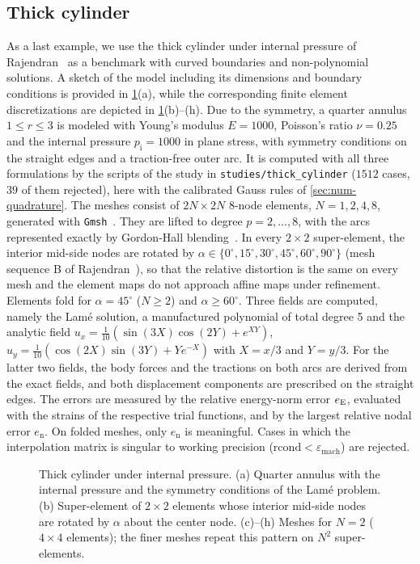 \subsection{Thick cylinder}
\label{sec:num-cylinder}
%
As a last example, we use the thick cylinder under internal pressure of Rajendran~\cite[Sect.~5.9]{Rajendran2010technique} as a benchmark with curved boundaries and non-polynomial solutions. A sketch of the model including its dimensions and boundary conditions is provided in \cref{fig:cylsetup}(a), while the corresponding finite element discretizations are depicted in \cref{fig:cylsetup}(b)--(h). Due to the symmetry, a quarter annulus $1\le r\le3$ is modeled with Young's modulus $E=1000$, Poisson's ratio $\nu=0.25$ and the internal pressure $p_{\mathrm{i}}=1000$ in plane stress, with symmetry conditions on the straight edges and a traction-free outer arc. It is computed with all three formulations by the scripts of the study in \texttt{studies/thick\_cylinder} ($1512$ cases, $39$ of them rejected), here with the calibrated Gauss rules of \cref{sec:num-quadrature}. The meshes consist of $2N\times2N$ 8-node elements, $N=1,2,4,8$, generated with \texttt{Gmsh}~\cite{Geuzaine2009Gmsh}. They are lifted to degree $p=2,\dots,8$, with the arcs represented exactly by Gordon-Hall blending~\cite{Gordon1973Transfinite}. In every $2\times2$ super-element, the interior mid-side nodes are rotated by $\alpha\in\{0^\circ,15^\circ,30^\circ,45^\circ,60^\circ,90^\circ\}$ (mesh sequence B of Rajendran~\cite{Rajendran2010technique}), so that the relative distortion is the same on every mesh and the element maps do not approach affine maps under refinement. Elements fold for $\alpha=45^\circ$ ($N\ge2$) and $\alpha\ge60^\circ$. Three fields are computed, namely the Lam\'e solution, a manufactured polynomial of total degree 5 and the analytic field $u_x=\tfrac1{10}(\sin(3X)\cos(2Y)+e^{XY})$, $u_y=\tfrac1{10}(\cos(2X)\sin(3Y)+Ye^{-X})$ with $X=x/3$ and $Y=y/3$. For the latter two fields, the body forces and the tractions on both arcs are derived from the exact fields, and both displacement components are prescribed on the straight edges. The errors are measured by the relative energy-norm error $e_{\mathrm{E}}$, evaluated with the strains of the respective trial functions, and by the largest relative nodal error $e_{\mathrm{n}}$. On folded meshes, only $e_{\mathrm{n}}$ is meaningful. Cases in which the interpolation matrix is singular to working precision ($\mathrm{rcond}<\varepsilon_{\mathrm{mach}}$) are rejected.

\begin{figure}[htbp]
  \centering
  
  \caption{Thick cylinder under internal pressure. (a) Quarter annulus with the internal pressure and the symmetry conditions of the Lam\'e problem. (b) Super-element of $2\times2$ elements whose interior mid-side nodes are rotated by $\alpha$ about the center node. (c)--(h) Meshes for $N=2$ ($4\times4$ elements); the finer meshes repeat this pattern on $N^2$ super-elements.}
  \label{fig:cylsetup}
\end{figure}

